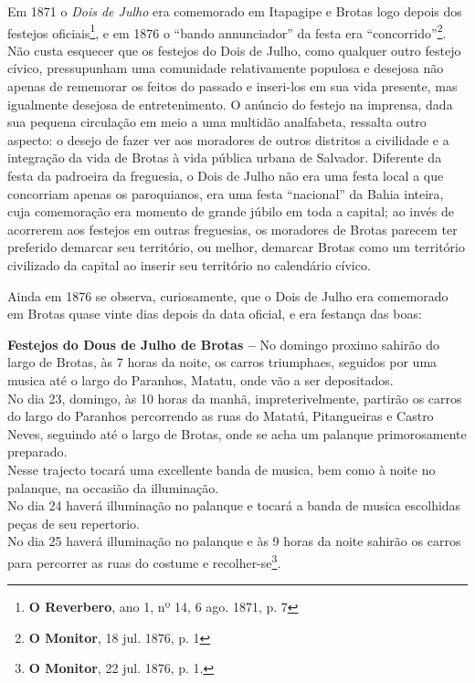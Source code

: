 Em 1871 o \textit{Dois de Julho} era comemorado em Itapagipe e Brotas logo depois dos festejos oficiais\footnote{\textbf{O Reverbero}, ano 1, nº 14, 6 ago. 1871, p. 7}, e em 1876 o ``bando annunciador'' da festa era ``concorrido''\footnote{\textbf{O Monitor}, 18 jul. 1876, p. 1}. Não custa esquecer que os festejos do Dois de Julho, como qualquer outro festejo cívico, pressupunham uma comunidade relativamente populosa e desejosa não apenas de rememorar os feitos do passado e inseri-los em sua vida presente, mas igualmente desejosa de entretenimento. O anúncio do festejo na imprensa, dada sua pequena circulação em meio a uma multidão analfabeta, ressalta outro aspecto: o desejo de fazer ver aos moradores de outros distritos a civilidade e a integração da vida de Brotas à vida pública urbana de Salvador. Diferente da festa da padroeira da freguesia, o Dois de Julho não era uma festa local a que concorriam apenas os paroquianos, era uma festa ``nacional'' da Bahia inteira, cuja comemoração era momento de grande júbilo em toda a capital; ao invés de acorrerem aos festejos em outras freguesias, os moradores de Brotas parecem ter preferido demarcar seu território, ou melhor, demarcar Brotas como um território civilizado da capital ao inserir seu território no calendário cívico.

Ainda em 1876 se observa, curiosamente, que o Dois de Julho era comemorado em Brotas quase vinte dias depois da data oficial, e era festança das boas:

\begin{citacao}
\textbf{Festejos do Dous de Julho de Brotas --} No domingo proximo sahirão do largo de Brotas, às 7 horas da noite, os carros triumphaes, seguidos por uma musica até o largo do Paranhos, Matatu, onde vão a ser depositados. \\
No dia 23, domingo, às 10 horas da manhã, impreterivelmente, partirão os carros do largo do Paranhos percorrendo as ruas do Matatú, Pitangueiras e Castro Neves, seguindo até o largo de Brotas, onde se acha um palanque primorosamente preparado. \\
Nesse trajecto tocará uma excellente banda de musica, bem como à noite no palanque, na occasião da illuminação. \\
No dia 24 haverá illuminação no palanque e tocará a banda de musica escolhidas peças de seu repertorio. \\
No dia 25 haverá illuminação no palanque e às 9 horas da noite sahirão os carros para percorrer as ruas do costume e recolher-se\footnote{\textbf{O Monitor}, 22 jul. 1876, p. 1.}.
\end{citacao}

